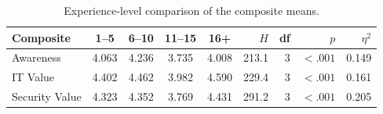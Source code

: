 \begin{table}[ht]
\centering
\caption{Experience-level comparison of the composite means.}
\label{tab:exp}
\small
\begin{tabular}{lccccrrrr}
\toprule
Composite & 1--5 & 6--10 & 11--15 & 16+ & $H$ & df & $p$ & $\eta^2$ \\
\midrule
Awareness & 4.063 & 4.236 & 3.735 & 4.008 & 213.1 & 3 & $<.001$ & 0.149 \\
IT Value & 4.402 & 4.462 & 3.982 & 4.590 & 229.4 & 3 & $<.001$ & 0.161 \\
Security Value & 4.323 & 4.352 & 3.769 & 4.431 & 291.2 & 3 & $<.001$ & 0.205 \\
\bottomrule
\end{tabular}
\end{table}
